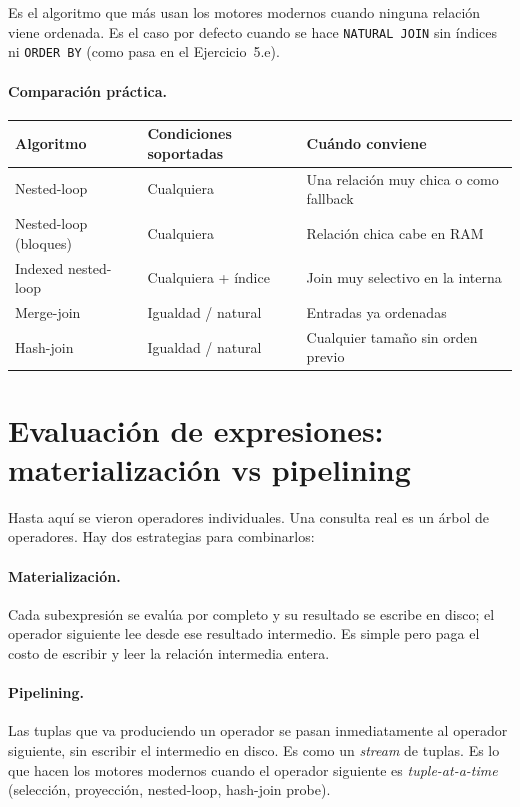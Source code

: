 \documentclass[11pt,a4paper]{article}
\begin{document}
Es el algoritmo que más usan los motores modernos cuando ninguna relación
viene ordenada. Es el caso por defecto cuando se hace
\texttt{NATURAL JOIN} sin índices ni \texttt{ORDER BY} (como pasa en el
Ejercicio~5.e).

\paragraph{Comparación práctica.}

\begin{center}
\begin{tabular}{lll}
\toprule
Algoritmo & Condiciones soportadas & Cuándo conviene \\
\midrule
Nested-loop          & Cualquiera             & Una relación muy chica o como fallback \\
Nested-loop (bloques)& Cualquiera             & Relación chica cabe en RAM \\
Indexed nested-loop  & Cualquiera + índice    & Join muy selectivo en la interna \\
Merge-join           & Igualdad / natural     & Entradas ya ordenadas \\
Hash-join            & Igualdad / natural     & Cualquier tamaño sin orden previo \\
\bottomrule
\end{tabular}
\end{center}

\section{Evaluación de expresiones: materialización vs pipelining}

Hasta aquí se vieron operadores individuales. Una consulta real es un árbol
de operadores. Hay dos estrategias para combinarlos:

\paragraph{Materialización.} Cada subexpresión se evalúa por completo y
su resultado se escribe en disco; el operador siguiente lee desde ese
resultado intermedio. Es simple pero paga el costo de escribir y leer la
relación intermedia entera.

\paragraph{Pipelining.} Las tuplas que va produciendo un operador se pasan
inmediatamente al operador siguiente, sin escribir el intermedio en disco.
Es como un \emph{stream} de tuplas. Es lo que hacen los motores modernos
cuando el operador siguiente es \emph{tuple-at-a-time} (selección,
proyección, nested-loop, hash-join probe).
\end{document}
